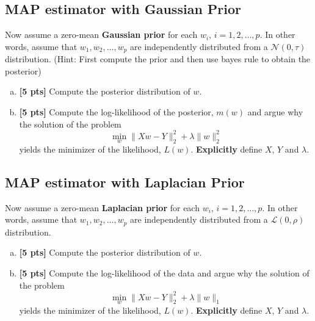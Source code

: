\documentclass{article}
\newenvironment{soln}{
	\leavevmode\color{blue}\ignorespaces
}{}
\begin{document}
\subsection{MAP estimator with Gaussian Prior}
Now assume a zero-mean \textbf{Gaussian prior} for each $w_i$, $i=1,2,\dots, p$. In other words, assume that $w_1, w_2, \dots, w_p$ are independently distributed from a $\mathcal{N}(0, \tau)$ distribution. (Hint: First compute the prior and then use bayes rule to obtain the posterior)

\begin{enumerate}[(a)]
  \item \textbf{[5 pts]} Compute the posterior distribution of $w$.
  
    \begin{soln}
  	
    \end{soln}
  
  
  \item \textbf{[5 pts]} Compute the log-likelihood of the posterior, $m(w)$ and argue why the solution of the problem
    \begin{equation}
      \min_{w} \lVert Xw - Y \rVert_2^2 + \lambda \lVert w \rVert_2^2
    \end{equation}
   yields the minimizer of the likelihood, $L(w)$. \textbf{Explicitly} define $X$, $Y$ and $\lambda$.
   
   \begin{soln}
     	
   \end{soln}
\end{enumerate}

\subsection{MAP estimator with Laplacian Prior}
Now assume a zero-mean \textbf{Laplacian prior} for each $w_i$, $i=1,2,\dots, p$. In other words, assume that $w_1, w_2, \dots, w_p$ are independently distributed from a $\mathcal{L}(0, \rho)$ distribution.

\begin{enumerate}[(a)]
  \item \textbf{[5 pts]} Compute the posterior distribution of $w$.
  
  \begin{soln}
  	
  \end{soln}
  
  
  
  \item \textbf{[5 pts]} Compute the log-likelihood of the data and argue why the solution of the problem
    \begin{equation}
      \min_{w} \lVert Xw - Y \rVert_2^2 + \lambda \lVert w \rVert_1
    \end{equation}
   yields the minimizer of the likelihood, $L(w)$. \textbf{Explicitly} define $X$, $Y$ and $\lambda$.
    
    \begin{soln}
    
    \end{soln}
      
\end{enumerate}
\end{document}
